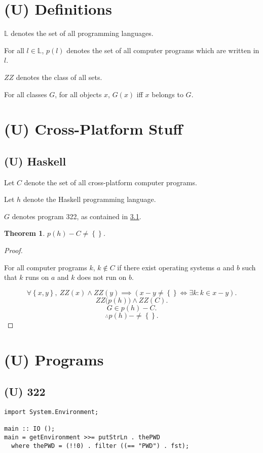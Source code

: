 \documentclass{article}
\newtheorem{thm}{Theorem}
\begin{document}
	\section{(U) Definitions}
		$\mathbb L$ denotes the set of all programming languages.

		For all $l \in \mathbb L$, $p(l)$ denotes the set of all computer
		programs which are written in $l$.

		$\mathit{ZZ}$ denotes the class of all sets.

		For all classes $G$, for all objects $x$, $G(x)$ iff $x$ belongs to
		$G$.
	\section{(U) Cross-Platform Stuff}
		\subsection{(U) Haskell}
			Let $C$ denote the set of all cross-platform computer programs.

			Let $h$ denote the Haskell programming language.

			$G$ denotes program 322, as contained in \cref{subsection:p322}.
			\begin{thm}
				$p(h) - C \neq \left\{\right\}$.
			\end{thm}
			\begin{proof}
				${}$

				For all computer programs $k$, $k \notin C$ if there exist
				operating systems $a$ and $b$ such that $k$ runs on $a$ and
				$k$ does not run on $b$.

				\[
					\forall \left\{x,y\right\},\ 
					\mathit{ZZ}(x) \land \mathit{ZZ}(y)\implies 
					\left(x - y \neq \left\{\right\} \iff
					\exists k : k \in x - y\right).
				\]
				\[
					\mathit{ZZ}\big(p(h)\big) \land \mathit{ZZ}(C).
				\]
				\[
					G \in p(h) - C.
				\]
				\[
					\therefore p(h) -  \neq \left\{\right\}.
				\]
			\end{proof}
	\section{(U) Programs}
		\subsection{(U) 322}\label{subsection:p322}
			\begin{lstlisting}
import System.Environment;

main :: IO ();
main = getEnvironment >>= putStrLn . thePWD
  where thePWD = (!!0) . filter ((== "PWD") . fst);
			\end{lstlisting}
\end{document}
